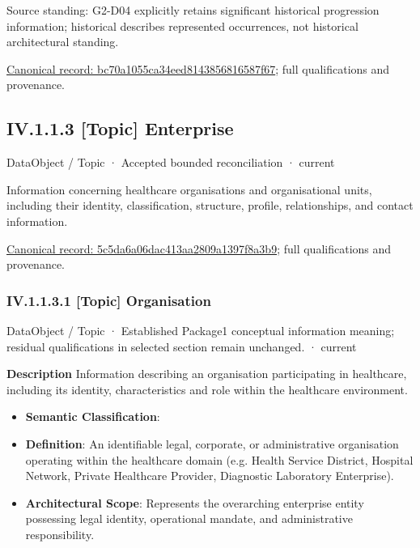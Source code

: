 Source standing: G2-D04 explicitly retains significant historical progression information; historical describes represented occurrences, not historical architectural standing.


{\footnotesize \href{../../../../continuum/application/data-object/topic/bc70a1055ca34eed8143856816587f67.md}{Canonical record: bc70a1055ca34eed8143856816587f67}; full qualifications and provenance.}\par
\subsection*{IV.1.1.3 [Topic] Enterprise}
\label{navigation:IV.1.1.3}

\label{element:5c5da6a06dac413aa2809a1397f8a3b9}
{\small DataObject / Topic · Accepted bounded reconciliation · current}\par

Information concerning healthcare organisations and organisational units, including their identity, classification, structure, profile, relationships, and contact information.


{\footnotesize \href{../../../../continuum/application/data-object/topic/5c5da6a06dac413aa2809a1397f8a3b9.md}{Canonical record: 5c5da6a06dac413aa2809a1397f8a3b9}; full qualifications and provenance.}\par
\subsubsection*{IV.1.1.3.1 [Topic] Organisation}
\label{navigation:IV.1.1.3.1}

\label{element:dd3ba70128874caeb2d5da419d006c49}
{\small DataObject / Topic · Established Package1 conceptual information meaning; residual qualifications in selected section remain unchanged. · current}\par

\textbf{Description}
Information describing an organisation participating in healthcare, including its identity, characteristics and role within the healthcare environment.



\begin{itemize}


\item \textbf{Semantic Classification}: \texttt{}

\item \textbf{Definition}: An identifiable legal, corporate, or administrative organisation operating within the healthcare domain (e.g. Health Service District, Hospital Network, Private Healthcare Provider, Diagnostic Laboratory Enterprise).

\item \textbf{Architectural Scope}: Represents the overarching enterprise entity possessing legal identity, operational mandate, and administrative responsibility.

\end{itemize}


